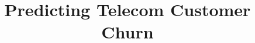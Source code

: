 \documentclass[a4paper,oneside,bibliography=totoc]{scrbook}
\begin{document}
\frontmatter
\subject{IE500 Data Mining Project Report}
\title{Predicting Telecom Customer Churn}
\author{} %
\date{} %
\publishers{{\small Submitted to}\\
  Data and Web Science Group\\
  University of Mannheim\\}
\maketitle



\begingroup%
\hypersetup{hidelinks}%
\tableofcontents%
\endgroup

\mainmatter








% 

\backmatter
% 
\end{document}
